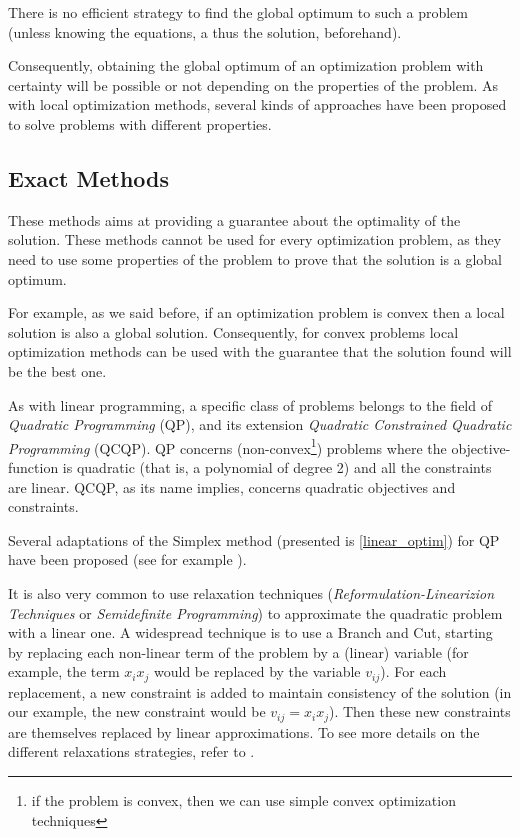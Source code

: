 There is no efficient strategy to find the global optimum to such a problem (unless knowing the equations, a thus the solution, beforehand).

Consequently, obtaining the global optimum of an optimization problem with certainty will be possible or not depending on the properties of the problem.
As with local optimization methods, several kinds of approaches have been proposed to solve problems with different properties.

\subsection{Exact Methods}

These methods aims at providing a guarantee about the optimality of the solution. These methods cannot be used for every optimization problem, as they need to use some properties of the problem to prove that the solution is a global optimum.

For example, as we said before, if an optimization problem is convex then a local solution is also a global solution. Consequently, for convex problems local optimization methods can be used with the guarantee that the solution found will be the best one.

As with linear programming, a specific class of problems belongs to the field of \emph{Quadratic Programming} (QP), and its extension \emph{Quadratic Constrained Quadratic Programming} (QCQP). QP concerns (non-convex\footnote{if the problem is convex, then we can use simple convex optimization techniques}) problems where the objective-function is quadratic (that is, a polynomial of degree 2) and all the constraints are linear. QCQP, as its name implies, concerns quadratic objectives and constraints.

Several adaptations of the Simplex method (presented is \ref{linear_optim}) for QP have been proposed (see for example \cite{wolfe1959simplex, dantzig1998linear, van1964simplicial}).

It is also very common to use relaxation techniques (\emph{Reformulation-Linearizion Techniques} or \emph{Semidefinite Programming}) to approximate the quadratic problem with a linear one. A widespread technique is to use a Branch and Cut, starting by replacing each non-linear term of the problem by a (linear) variable (for example, the term $x_ix_j$ would be replaced by the variable $v_{ij}$). For each replacement, a new constraint is added to maintain consistency of the solution (in our example, the new constraint would be $v_{ij} = x_ix_j$). Then these new constraints are themselves replaced by linear approximations.
To see more details on the different relaxations strategies, refer to \cite{audet2000branch}.

